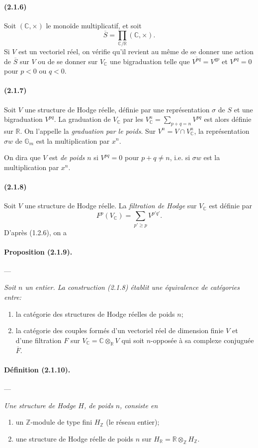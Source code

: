 \documentclass[10pt]{article}
\newcommand{\C}{\mathbb C}
\newcommand{\Z}{\mathbb Z}
\newcommand{\fg}{\guillemotright}
\newcommand{\og}{\guillemotleft}
\newcommand{\R}{\mathbb R}
\newcommand{\Gm}{\mathbb G_m}
\begin{document}
\paragraph{(2.1.6)} Soit $(\C,\times)$ le monoïde multiplicatif, et soit
\[
\overline S=\prod_{\C/\R}(\C,\times).
\]
Si $V$ est un vectoriel réel, on vérifie qu'il revient au même de se donner une action de $\overline S$ sur $V$ ou de se donner sur $V_\C$ une bigraduation telle que $\overline{V^{pq}}=V^{qp}$ et $V^{pq}=0$ pour $p<0$ ou $q<0$.

\paragraph{(2.1.7)} Soit $V$ une structure de Hodge réelle, définie par une représentation $\sigma$ de $S$ et une bigraduation $V^{pq}$. La graduation de $V_\C$ par les $V_\C^n=\sum_{p+q=n}V^{pq}$ est alors définie sur $\R$. On l'appelle la \emph{graduation par le poids}. Sur $V^n=V\cap V_\C^n$, la représentation $\sigma w$ de $\Gm$ est la multiplication par $x^n$.

On dira que $V$ est \emph{de poids $n$} si $V^{pq}=0$ pour $p+q\ne n$, i.e. si $\sigma w$ est la multiplication par $x^n$.

\paragraph{(2.1.8)} Soit $V$ une structure de Hodge réelle. La \emph{filtration de Hodge} sur $V_\C$ est définie par
\[
F^p(V_\C)=\sum_{p'\ge p}V^{p'q'}.
\]
D'après (1.2.6), on a

\paragraph{Proposition (2.1.9).} --- {\itshape Soit $n$ un entier. La construction (2.1.8) établit une équivalence de catégories entre:
\begin{enumerate}[label=\alph*)]
\item la catégorie des structures de Hodge réelles de poids $n$;
\item la catégorie des couples formés d'un vectoriel réel de dimension finie $V$ et d'une filtration $F$ sur $V_\C=\C\otimes_\R V$ qui soit $n$-opposée à sa complexe conjuguée $\overline F$.
\end{enumerate}}

\paragraph{Définition (2.1.10).} --- {\itshape Une structure de Hodge $H$, de poids $n$, consiste en
\begin{enumerate}[label=\alph*)]
\item un $\Z$-module de type fini $H_\Z$ (le \og réseau entier\fg{});
\item une structure de Hodge réelle de poids $n$ sur $H_\R=\R\otimes_\Z H_\Z$.
\end{enumerate}}
\end{document}
